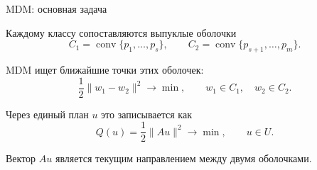 \SPBGContentSlide
  {MDM: основная задача}
  {%
    \FormulaBody
    Каждому классу сопоставляются выпуклые оболочки
    \[
      C_1=\operatorname{conv}\{p_1,\ldots,p_s\},
      \qquad
      C_2=\operatorname{conv}\{p_{s+1},\ldots,p_m\}.
    \]

    MDM ищет ближайшие точки этих оболочек:
    \[
      \frac12\|w_1-w_2\|^2\to\min,
      \qquad
      w_1\in C_1,\quad w_2\in C_2.
    \]

    Через единый план \(u\) это записывается как
    \[
      Q(u)=\frac12\|Au\|^2\to\min,\qquad u\in U.
    \]

    \Body
    Вектор \(Au\) является текущим направлением между двумя оболочками.
  }

